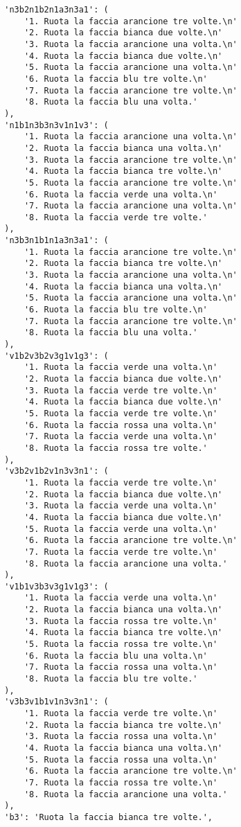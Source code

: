 \begin{lstlisting}
        'n3b2n1b2n1a3n3a1': (
            '1. Ruota la faccia arancione tre volte.\n'
            '2. Ruota la faccia bianca due volte.\n'
            '3. Ruota la faccia arancione una volta.\n'
            '4. Ruota la faccia bianca due volte.\n'
            '5. Ruota la faccia arancione una volta.\n'
            '6. Ruota la faccia blu tre volte.\n'
            '7. Ruota la faccia arancione tre volte.\n'
            '8. Ruota la faccia blu una volta.'
        ),
        'n1b1n3b3n3v1n1v3': (
            '1. Ruota la faccia arancione una volta.\n'
            '2. Ruota la faccia bianca una volta.\n'
            '3. Ruota la faccia arancione tre volte.\n'
            '4. Ruota la faccia bianca tre volte.\n'
            '5. Ruota la faccia arancione tre volte.\n'
            '6. Ruota la faccia verde una volta.\n'
            '7. Ruota la faccia arancione una volta.\n'
            '8. Ruota la faccia verde tre volte.'
        ),
        'n3b3n1b1n1a3n3a1': (
            '1. Ruota la faccia arancione tre volte.\n'
            '2. Ruota la faccia bianca tre volte.\n'
            '3. Ruota la faccia arancione una volta.\n'
            '4. Ruota la faccia bianca una volta.\n'
            '5. Ruota la faccia arancione una volta.\n'
            '6. Ruota la faccia blu tre volte.\n'
            '7. Ruota la faccia arancione tre volte.\n'
            '8. Ruota la faccia blu una volta.'
        ),
        'v1b2v3b2v3g1v1g3': (
            '1. Ruota la faccia verde una volta.\n'
            '2. Ruota la faccia bianca due volte.\n'
            '3. Ruota la faccia verde tre volte.\n'
            '4. Ruota la faccia bianca due volte.\n'
            '5. Ruota la faccia verde tre volte.\n'
            '6. Ruota la faccia rossa una volta.\n'
            '7. Ruota la faccia verde una volta.\n'
            '8. Ruota la faccia rossa tre volte.'
        ),
        'v3b2v1b2v1n3v3n1': (
            '1. Ruota la faccia verde tre volte.\n'
            '2. Ruota la faccia bianca due volte.\n'
            '3. Ruota la faccia verde una volta.\n'
            '4. Ruota la faccia bianca due volte.\n'
            '5. Ruota la faccia verde una volta.\n'
            '6. Ruota la faccia arancione tre volte.\n'
            '7. Ruota la faccia verde tre volte.\n'
            '8. Ruota la faccia arancione una volta.'
        ),
        'v1b1v3b3v3g1v1g3': (
            '1. Ruota la faccia verde una volta.\n'
            '2. Ruota la faccia bianca una volta.\n'
            '3. Ruota la faccia rossa tre volte.\n'
            '4. Ruota la faccia bianca tre volte.\n'
            '5. Ruota la faccia rossa tre volte.\n'
            '6. Ruota la faccia blu una volta.\n'
            '7. Ruota la faccia rossa una volta.\n'
            '8. Ruota la faccia blu tre volte.'
        ),
        'v3b3v1b1v1n3v3n1': (
            '1. Ruota la faccia verde tre volte.\n'
            '2. Ruota la faccia bianca tre volte.\n'
            '3. Ruota la faccia rossa una volta.\n'
            '4. Ruota la faccia bianca una volta.\n'
            '5. Ruota la faccia rossa una volta.\n'
            '6. Ruota la faccia arancione tre volte.\n'
            '7. Ruota la faccia rossa tre volte.\n'
            '8. Ruota la faccia arancione una volta.'
        ),
        'b3': 'Ruota la faccia bianca tre volte.',


\end{lstlisting}
